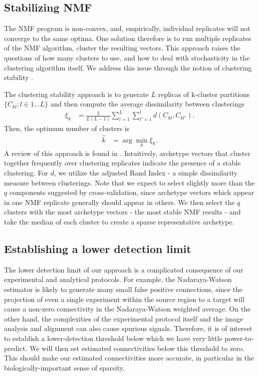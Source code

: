 \subsection{Stabilizing NMF}

The NMF program is non-convex, and, empirically, individual replicates will not converge to the same optima.
One solution therefore is to run multiple replicates of the NMF algorithm, cluster the resulting vectors.
This approach raises the questions of how many clusters to use, and how to deal with stochasticity in the clustering algorithm itself.
We address this issue through the notion of clustering stability \citep{Von_Luxburg2010-lu}.

The clustering stability approach is to generate $L$ replicas of k-cluster partitions $\{C_{kl} : l \in 1 \dots L\}$ and then compute the average dissimilarity between clusterings
\begin{align*}
\xi_k &= \frac{2}{L(L - 1)} \sum_{l = 1}^{L} \sum_{l'= 1}^{l}  d(C_{kl}, C_{kl'}).
\end{align*}
Then, the optimum number of clusters is 
\begin{align*}
\hat k &= \arg \min_k \xi_k.
\end{align*}
A review of this approach is found in \citet{Von_Luxburg2010-qe}.
Intuitively, archetype vectors that cluster together frequently over clustering replicates indicate the presence of a stable clustering.
For $d$, we utilize the adjusted Rand Index - a simple dissimilarity measure between clusterings.
Note that we expect to select slightly more than the $q$ components suggested by cross-validation, since archetype vectors which appear in one NMF replicate generally should appear in others.
We then select the $q$ clusters with the most archetype vectors - the most stable NMF results - and take the median of each cluster to create a sparse representative archetype.


\subsection{Establishing a lower detection limit}

The lower detection limit of our approach is a complicated consequence of our experimental and analytical protocols.
For example, the Nadaraya-Watson estimator is likely to generate many small false positive connections, since the projection of even a single experiment within the source region to a target will cause a non-zero connectivity in the Nadaraya-Watson weighted average.
On the other hand, the complexities of the experimental protocol itself and the image analysis and alignment can also cause spurious signals.
Therefore, it is of interest to establish a lower-detection threshold below which we have very little power-to-predict.
We will then set estimated connectivities below this threshold to zero.
This should make our estimated connectivities more accurate, in particular in the biologically-important sense of sparsity.

